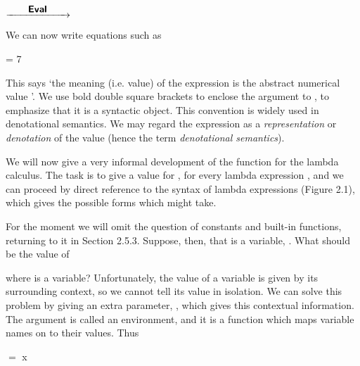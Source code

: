 \begin{center}
         $\xrightarrow{\qquad\text{\normalsize {\sffamily \bfseries Eval}{}}\qquad}$ 
\end{center}

We can now write equations such as
\begin{mlcoded}
     = 7
\end{mlcoded}
This says `the meaning (i.e. value) of the expression  is the abstract
numerical value '. We use bold double square brackets to enclose the
argument to \eval{}, to emphasize that it is a syntactic object. This convention is
widely used in denotational semantics. We may regard the expression 
as a \textit{representation} or \textit{denotation} of the value  (hence the term \textit{denotational semantics}).

We will now give a very informal development of the \eval{} function for the
lambda calculus. The task is to give a value for , for every lambda
expression , and we can proceed by direct reference to the syntax of lambda
expressions (Figure 2.1), which gives the possible forms which  might take.

For the moment we will omit the question of constants and built-in
functions, returning to it in Section 2.5.3. Suppose, then, that  is a variable,
. What should be the value of
\begin{mlcoded}
\end{mlcoded}
where  is a variable? Unfortunately, the value of a variable is given by its
surrounding context, so we cannot tell its value in isolation. We can solve this
problem by giving \eval{} an extra parameter, \tr{}, which gives this contextual
information. The argument \tr{} is called an environment, and it is a function
which maps variable names on to their values. Thus
\begin{mlcoded}
     \tr{} $=$ \tr{} x
\end{mlcoded}


